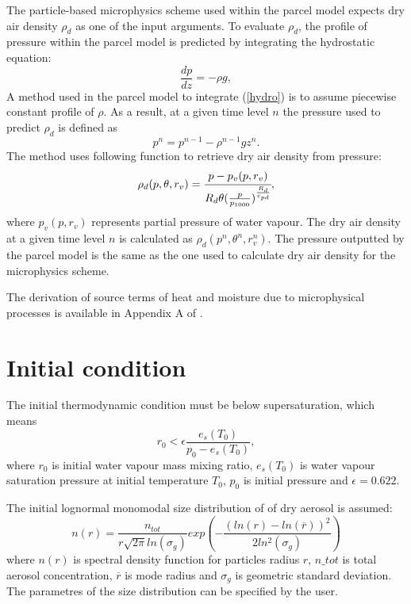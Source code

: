 \documentclass[11pt]{article}
\begin{document}
The particle-based microphysics scheme used within the parcel model expects dry air density $\rho_d$ as one of the input arguments.
To evaluate $\rho_d$, the profile of pressure within the parcel model is predicted by integrating the hydrostatic equation:
\begin{equation}
	\frac{dp}{dz} = -\rho g,
	\label{hydro}
\end{equation}
A method used in the parcel model to integrate (\ref{hydro}) is to assume piecewise constant profile of $\rho$. 
As a result, at a given time level $n$ the pressure used to predict $\rho_d$ is defined as
  \begin{equation*}
    p^n = p^{n-1} - \rho^{n-1} g z^n .
  \end{equation*}
\noindent
The method uses following function to retrieve dry air density from pressure:
\begin{equation}
  \rho_{d}(p, \theta, r_v) = \cfrac{p - p_v(p, r_v)}{ R_d \theta (\frac{p}{p_{1000}})^{\frac{R_d}{c_{pd}}}},
  \label{rho}
\end{equation}
\noindent
where $p_v(p, r_v)$ represents partial pressure of water vapour.
The dry air density at a given time level $n$ is calculated as $\rho_d(p^n, \theta^n, r_v^n)$. 
The pressure outputted by the parcel model is the same as the one used to calculate dry air density for the microphysics scheme.


The derivation of source terms of heat and moisture due to microphysical processes 
  is available in Appendix A of \citep{Arabas_et_al_2015}.


\section{Initial condition}

The initial thermodynamic condition must be below supersaturation, which means
\begin{equation}
	r_0 < \epsilon \frac{e_s(T_0)}{p_0 - e_s(T_0)},
\end{equation}
\noindent
where $r_0$ is initial water vapour mass mixing ratio, $e_s(T_0)$ is water vapour saturation pressure at initial temperature $T_0$, $p_0$ is initial pressure and $\epsilon = 0.622$.

The initial lognormal monomodal size distribution of of dry aerosol is assumed:
\begin{equation}
        n(r) = \frac{n_{tot}}{r\sqrt{2\pi}ln(\sigma_g)}exp(-\frac{(ln(r)-ln(\overline{r}))^2}{2ln^2(\sigma_g)})
        \label{lognormalny}
\end{equation}
\noindent
where $n(r)$ is spectral density function for particles radius $r$, $n\_tot$ is total aerosol concentration, $\overline{r}$ is mode radius and $\sigma_g$ is geometric standard deviation.
The parametres of the size distribution can be specified by the user.
\end{document}
